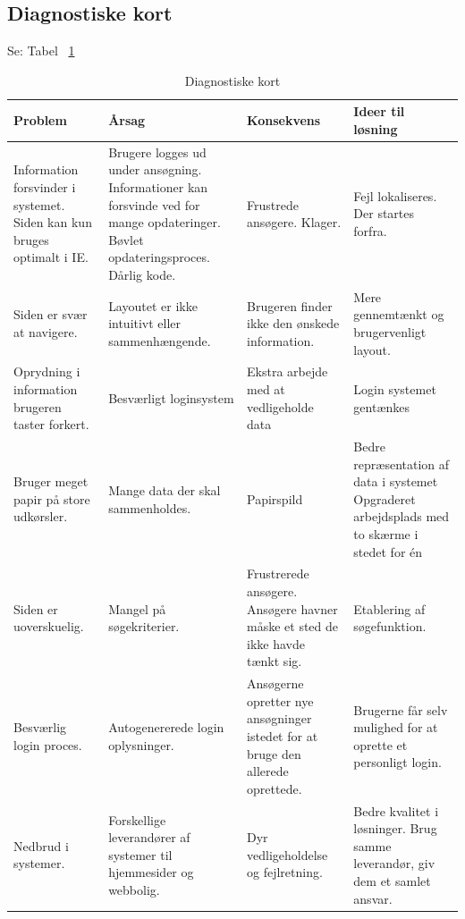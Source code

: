 \documentclass[12pt, a4paper]{report}
\begin{document}
\subsection{Diagnostiske kort}
Se: Tabel ~\ref{d_kort}
\begin{table}
\caption{Diagnostiske kort}
\label{d_kort}
\begin{tabular}{| p{4cm} | p{4cm} | p{4cm} | p{4cm} |}
\hline
Problem & Årsag & Konsekvens & Ideer til løsning \\ \hline
Information forsvinder i systemet. \newline Siden kan kun bruges optimalt i IE. & Brugere logges ud under ansøgning. \newline Informationer kan forsvinde ved for mange opdateringer. \newline Bøvlet opdateringsproces. \newline Dårlig kode. & Frustrede ansøgere. \newline Klager. & Fejl lokaliseres. \newline Der startes forfra. \\ \hline

Siden er svær at navigere. & Layoutet er ikke intuitivt eller sammenhængende. & Brugeren finder ikke den ønskede information. & Mere gennemtænkt og brugervenligt layout. \\ \hline

Oprydning i information brugeren taster forkert. & Besværligt loginsystem & Ekstra arbejde med at vedligeholde data & Login systemet gentænkes \\ \hline

Bruger meget papir på store udkørsler. & Mange data der skal sammenholdes. & Papirspild & Bedre repræsentation af data i systemet \newline Opgraderet arbejdsplads med to skærme i stedet for én \\ \hline

Siden er uoverskuelig. & Mangel på søgekriterier. & Frustrerede ansøgere. \newline Ansøgere havner måske et sted de ikke havde tænkt sig. & Etablering af søgefunktion. \\ \hline

Besværlig login proces. & Autogenererede login oplysninger. & Ansøgerne opretter nye ansøgninger istedet for at bruge den allerede oprettede. & Brugerne får selv mulighed for at oprette et personligt login. \\ \hline

Nedbrud i systemer. & Forskellige leverandører af systemer til hjemmesider og webbolig. & Dyr vedligeholdelse og fejlretning. & Bedre kvalitet i løsninger. \newline Brug samme leverandør, giv dem et samlet ansvar. \\ \hline

\end{tabular}
\end{table}
\end{document}
